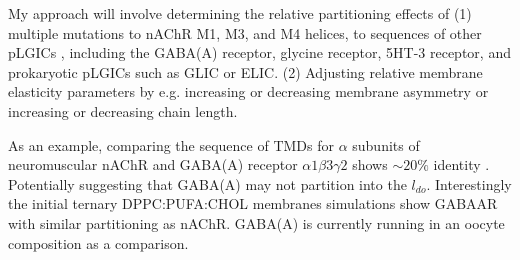 \documentclass{article}
\begin{document}
My approach will involve determining the relative partitioning effects of (1) multiple mutations to nAChR M1, M3, and M4 helices, to sequences of other pLGICs , including the GABA(A) receptor, glycine receptor, 5HT-3 receptor, and prokaryotic pLGICs such as GLIC or ELIC.  (2) Adjusting relative membrane elasticity parameters by e.g. increasing or decreasing membrane asymmetry or increasing or decreasing chain length. %

As an example, comparing the sequence of TMDs for $\alpha$ subunits of neuromuscular nAChR and GABA(A) receptor $ \alpha 1\beta 3\gamma 2 $ shows $\sim 20 \% $ identity \cite{jalv}. Potentially suggesting that GABA(A) may not partition into the $l_{do}$. Interestingly the initial ternary DPPC:PUFA:CHOL membranes simulations show GABAAR with similar partitioning as nAChR. GABA(A) is currently running in an oocyte composition as a comparison. 


\printbibliography
\end{document}
